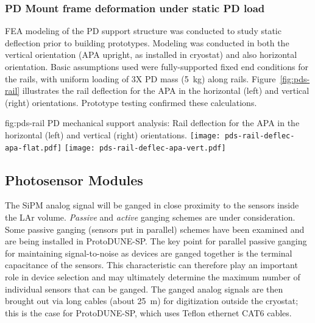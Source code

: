 \subsubsection{PD Mount frame deformation under static PD load}

FEA modeling of the PD support structure was conducted to study static deflection 
prior to building prototypes.  Modeling was conducted in both the vertical
 orientation (APA upright, as installed in cryostat) and also horizontal orientation.  
Basic assumptions used were fully-supported fixed end conditions for the rails, 
with uniform loading of 3X PD mass (\SI{5}{kg}) along rails.  
Figure~\ref{fig:pds-rail} illustrates the rail deflection for the APA in the horizontal (left) and vertical (right) orientations.
Prototype testing confirmed these calculations.

\begin{dunefigure}{fig:pds-rail}
{PD mechanical support analysis: Rail deflection for the APA in the horizontal (left) and vertical (right) orientations.}
	\texttt{[image: pds-rail-deflec-apa-flat.pdf]} 
	\texttt{[image: pds-rail-deflec-apa-vert.pdf]}\\
\end{dunefigure}



\subsection{Photosensor Modules}
\label{sec:fdsp-pd-assy-psm}

The SiPM analog signal will be ganged in close proximity to the sensors inside the
LAr volume. {\it Passive} and {\it active} ganging schemes are under consideration. Some passive
ganging (sensors put in parallel) schemes have been examined and are being installed in
ProtoDUNE-SP.
The key point for parallel passive ganging for maintaining signal-to-noise as devices are ganged together is the terminal capacitance of the sensors. This characteristic can therefore play an important role in device selection and may ultimately determine  the maximum number of individual sensors that can be ganged. The ganged analog signals are then brought out via long cables (about \SI{25}{m}) for digitization outside the cryostat; this is the case for ProtoDUNE-SP, which uses Teflon ethernet CAT6 cables.

